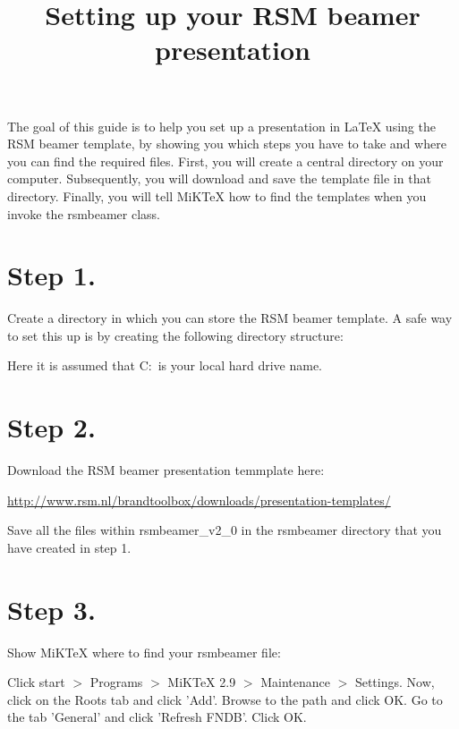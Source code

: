 \documentclass[11pt]{scrartcl}
\begin{document}

\title{Setting up your RSM beamer presentation}
\maketitle	

\noindent The goal of this guide is to help you set up a presentation in LaTeX using the RSM beamer template, by showing you which steps you have to take and where you can find the required files. First, you will create a central directory on your computer. Subsequently, you will download and save the template file in that directory. Finally, you will tell MiKTeX how to find the templates when you invoke the rsmbeamer class.

\section*{Step 1.}
Create a directory in which you can store the RSM beamer template. A safe way to set this up is by creating the following directory structure: \vspace{1em}

\noindent{} \vspace{1em}

\noindent Here it is assumed that C:\ is your local hard drive name.

\section*{Step 2.}
Download the RSM beamer presentation temmplate here: \vspace{1em}

\noindent \url{http://www.rsm.nl/brandtoolbox/downloads/presentation-templates/} \vspace{1em}

\noindent Save all the files within rsmbeamer\_v2\_0 in the rsmbeamer directory that you have created in step 1.

\section*{Step 3.}
Show MiKTeX where to find your rsmbeamer file: \vspace{1em}

\noindent Click start $>$ Programs $>$ MiKTeX 2.9 $>$ Maintenance $>$ Settings. Now, click on the Roots tab and click 'Add'. Browse to the path  and click OK. Go to the tab 'General' and click 'Refresh FNDB'. Click OK.
\end{document}
